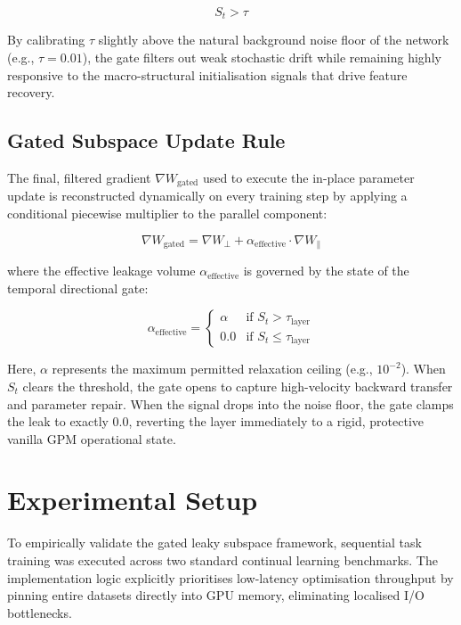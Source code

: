 \documentclass[10pt,a4paper]{article}
\begin{document}
		\begin{equation}
			S_t > \tau
		\end{equation}
		
		By calibrating $\tau$ slightly above the natural background noise floor of the network (e.g., $\tau = 0.01$), the gate filters out weak stochastic drift while remaining highly responsive to the macro-structural initialisation signals that drive feature recovery.
		
		\subsection{Gated Subspace Update Rule}
		
		The final, filtered gradient $\nabla W_{\text{gated}}$ used to execute the in-place parameter update is reconstructed dynamically on every training step by applying a conditional piecewise multiplier to the parallel component:
		
		\begin{equation}
			\nabla W_{\text{gated}} = \nabla W_{\perp} + \alpha_{\text{effective}} \cdot \nabla W_{\parallel}
		\end{equation}
		
		where the effective leakage volume $\alpha_{\text{effective}}$ is governed by the state of the temporal directional gate:
		
		\begin{equation}
			\alpha_{\text{effective}} = 
			\begin{cases} 
				\alpha & \text{if } S_t > \tau_{\text{layer}} \\
				0.0 & \text{if } S_t \le \tau_{\text{layer}}
			\end{cases}
		\end{equation}
		
		Here, $\alpha$ represents the maximum permitted relaxation ceiling (e.g., $10^{-2}$). When $S_t$ clears the threshold, the gate opens to capture high-velocity backward transfer and parameter repair. When the signal drops into the noise floor, the gate clamps the leak to exactly $0.0$, reverting the layer immediately to a rigid, protective vanilla GPM operational state.
		
		\section{Experimental Setup}
		
		To empirically validate the gated leaky subspace framework, sequential task training was executed across two standard continual learning benchmarks. The implementation logic explicitly prioritises low-latency optimisation throughput by pinning entire datasets directly into GPU memory, eliminating localised I/O bottlenecks.
		
\end{document}

